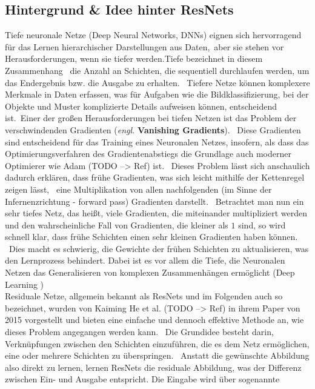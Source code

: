 \subsection{Hintergrund \& Idee hinter \glqq ResNets\grqq{}}\label{subsec:ResNetsBackgroundAndIdea}
Tiefe neuronale Netze (Deep Neural Networks, DNNs) eignen sich hervorragend für das Lernen hierarchischer Darstellungen aus Daten,\
aber sie stehen vor Herausforderungen, wenn sie \glqq tiefer\grqq{} werden.\glqq Tiefe\grqq{} bezeichnet in diesem Zusammenhang \ 
die Anzahl an Schichten, die sequentiell durchlaufen werden, um das Endergebnis bzw. die Ausgabe zu erhalten. \
Tiefere Netze können komplexere Merkmale in Daten erfassen, was für Aufgaben wie die Bildklassifizierung, bei der Objekte und Muster komplizierte Details aufweisen können, entscheidend ist.\
Einer der großen Herausforderungen bei tiefen Netzen ist das Problem der \glqq verschwindenden Gradienten\grqq{} (\textit{engl.} \textbf{Vanishing Gradients}). \
Diese Gradienten sind entscheidend für das Training eines Neuronalen Netzes, insofern, als dass das Optimierungsverfahren des Gradientenabstiegs die Grundlage auch moderner Optimierer wie \glqq Adam\grqq{} (TODO --> Ref) ist. \ 
Dieses Problem lässt sich anschaulich dadurch erklären, dass frühe Gradienten, was sich leicht mithilfe der Kettenregel zeigen lässt, \ 
eine Multiplikation von allen nachfolgenden (im Sinne der Infernenzrichtung - \glqq forward pass\grqq{}) Gradienten darstellt. \
Betrachtet man nun ein sehr tiefes Netz, das heißt, viele Gradienten, die miteinander multipliziert werden und den wahrscheinliche Fall von Gradienten, die kleiner als $1$ sind, so wird schnell klar, dass frühe Schichten einen sehr kleinen Gradienten haben können. \
Dies macht es schwierig, die Gewichte der frühen Schichten zu aktualisieren, was den Lernprozess behindert. Dabei ist es vor allem die Tiefe, die Neuronalen Netzen das Generalisieren von komplexen Zusammenhängen ermöglicht (\glqq Deep Learning \grqq{})\\
Residuale Netze, allgemein bekannt als ResNets und im Folgenden auch so bezeichnet, wurden von Kaiming He et al. (TODO --> Ref) in ihrem Paper von 2015 vorgestellt und bieten eine einfache und dennoch effektive Methode an, wie dieses Problem angegangen werden kann. \
Die Grundidee besteht darin, Verknüpfungen zwischen den Schichten einzuführen, die es dem Netz ermöglichen, eine oder mehrere Schichten zu \glqq überspringen\grqq{}. \ 
Anstatt die gewünschte Abbildung also direkt zu lernen, lernen ResNets die residuale Abbildung, was der Differenz zwischen Ein- und Ausgabe entspricht. Die Eingabe wird über sogenannte \
